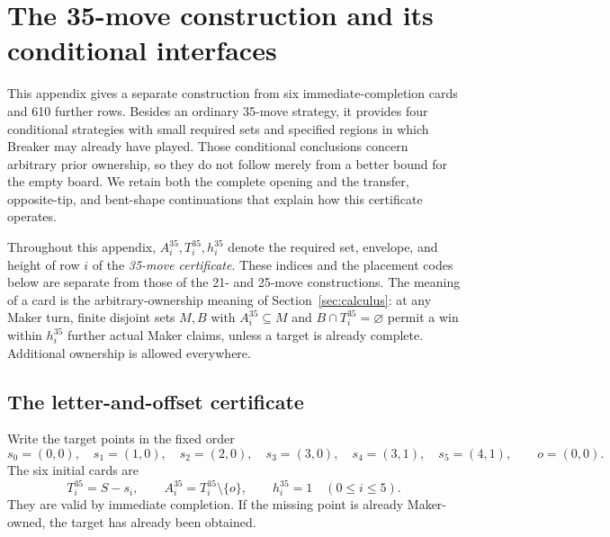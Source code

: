 \section{The 35-move construction and its conditional interfaces}
\label{app:route35}

This appendix gives a separate construction from six immediate-completion
cards and 610 further rows.  Besides an ordinary 35-move strategy, it
provides four conditional strategies with small required sets and
specified regions in which Breaker may already have played.  Those
conditional conclusions concern arbitrary prior ownership, so they do
not follow merely from a better bound for the empty board.
We retain both the complete opening and the transfer, opposite-tip, and
bent-shape continuations that explain how this certificate operates.

Throughout this appendix, \(A_i^{35},T_i^{35},h_i^{35}\) denote the required
set, envelope, and height of row \(i\) of the \emph{35-move certificate}.
These indices and the placement codes below are separate from those of
the 21- and 25-move constructions.  The meaning of a card is the
arbitrary-ownership meaning of Section~\ref{sec:calculus}: at any Maker
turn, finite disjoint sets \(M,B\) with
\(A_i^{35}\subseteq M\) and \(B\cap T_i^{35}=\varnothing\) permit a win
within \(h_i^{35}\) further actual Maker claims, unless a target is
already complete.  Additional ownership is allowed everywhere.

\subsection{The letter-and-offset certificate}
\label{r35:decoder}

Write the target points in the fixed order
\[
 s_0=(0,0),\quad s_1=(1,0),\quad s_2=(2,0),\quad
 s_3=(3,0),\quad s_4=(3,1),\quad s_5=(4,1),
 \qquad o=(0,0).
\]
The six initial cards are
\begin{equation}\label{r35:bases}
 T_i^{35}=S-s_i,\qquad
 A_i^{35}=T_i^{35}\setminus\{o\},\qquad h_i^{35}=1
 \quad(0\le i\le5).
\end{equation}
They are valid by immediate completion.  If the missing point is already
Maker-owned, the target has already been obtained.

